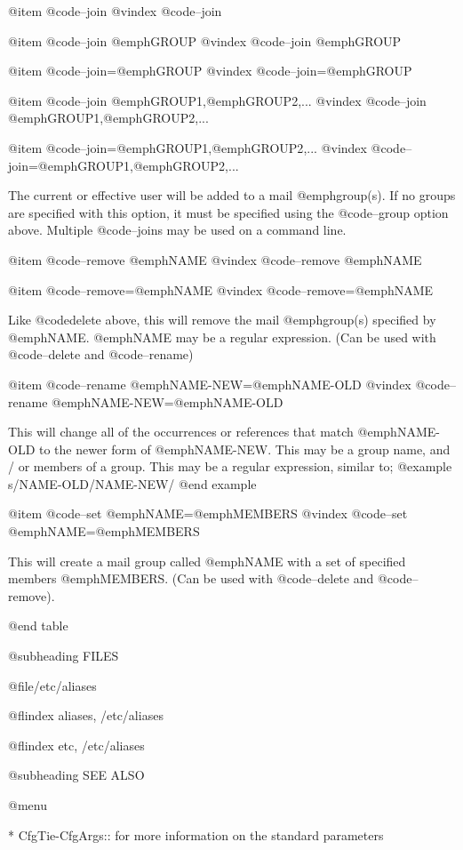 @item @code{--join}
@vindex @code{--join}

@item @code{--join }@emph{GROUP}
@vindex @code{--join }@emph{GROUP}

@item @code{--join=}@emph{GROUP}
@vindex @code{--join=}@emph{GROUP}

@item @code{--join }@emph{GROUP1},@emph{GROUP2},...
@vindex @code{--join }@emph{GROUP1},@emph{GROUP2},...

@item @code{--join=}@emph{GROUP1},@emph{GROUP2},...
@vindex @code{--join=}@emph{GROUP1},@emph{GROUP2},...

The current or effective user will be added to a mail @emph{group}(s).  If no groups 
are specified with this option, it must be specified using the @code{--group} option
above.  Multiple @code{--join}s may be used on a command line.

@item @code{--remove }@emph{NAME}
@vindex @code{--remove }@emph{NAME}

@item @code{--remove=}@emph{NAME}
@vindex @code{--remove=}@emph{NAME}

Like @code{delete} above, this will remove the mail @emph{group}(s) specified by @emph{NAME}.
@emph{NAME} may be a regular expression.  (Can be used with @code{--delete} and
@code{--rename})

@item @code{--rename} @emph{NAME-NEW}=@emph{NAME-OLD}
@vindex @code{--rename} @emph{NAME-NEW}=@emph{NAME-OLD}

This will change all of the occurrences or references that match @emph{NAME-OLD} to
the newer form of @emph{NAME-NEW}.  This may be a group name, and / or members of a
group.  This may be a regular expression, similar to;
@example
        s/NAME-OLD/NAME-NEW/
@end example

@item @code{--set} @emph{NAME}=@emph{MEMBERS}
@vindex @code{--set} @emph{NAME}=@emph{MEMBERS}

This will create a mail group called @emph{NAME} with a set of specified members
@emph{MEMBERS}.
(Can be used with @code{--delete} and  @code{--remove}).

@end table

@subheading FILES

@file{/etc/aliases}

@flindex aliases, /etc/aliases

@flindex etc, /etc/aliases

@subheading SEE ALSO


@menu

* CfgTie-CfgArgs::	
 for more information on the standard parameters

